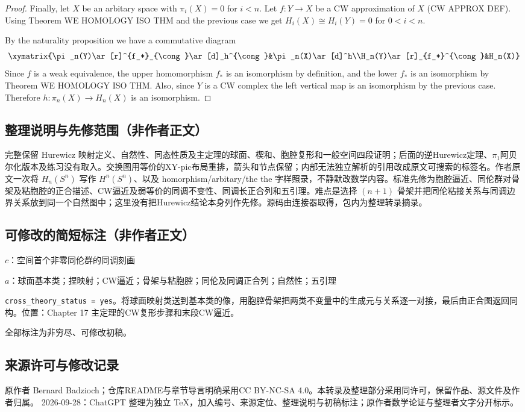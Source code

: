 \documentclass[UTF8,11pt]{ctexart}
\theoremstyle{definition}
\begin{document}
\begin{proof}
Finally, let $X$ be an arbitary space with $\pi_i(X)=0$ for $i<n$. Let $f:Y\to X$ be a CW approximation of $X$ (\textsf{CW APPROX DEF}). Using Theorem \textsf{WE HOMOLOGY ISO THM} and the previous case we get $H_i(X)\cong H_i(Y)=0$ for $0<i<n$.

By the naturality proposition we have a commutative diagram
\[
\xymatrix{\pi_n(Y)\ar[r]^{f_*}_{\cong}\ar[d]_h^{\cong}&\pi_n(X)\ar[d]^h\\H_n(Y)\ar[r]_{f_*}^{\cong}&H_n(X)}
\]
Since $f$ is a weak equivalence, the upper homomorphism $f_*$ is an isomorphism by definition, and the lower $f_*$ is an isomorphism by Theorem \textsf{WE HOMOLOGY ISO THM}. Also, since $Y$ is a CW complex the left vertical map is an isomorphism by the previous case. Therefore $h:\pi_n(X)\to H_n(X)$ is an isomorphism.
\end{proof}

\subsection*{整理说明与先修范围（非作者正文）}
完整保留 Hurewicz 映射定义、自然性、同态性质及主定理的球面、楔和、胞腔复形和一般空间四段证明；后面的逆Hurewicz定理、$\pi_1$阿贝尔化版本及练习没有取入。交换图用等价的XY-pic布局重排，箭头和节点保留；内部无法独立解析的引用改成原文可搜索的标签名。作者原文一次将 $H_n(S^n)$ 写作 $H^n(S^n)$、以及 homorphism/arbitary/the the 字样照录，不静默改数学内容。标准先修为胞腔逼近、同伦群对骨架及粘胞腔的正合描述、CW逼近及弱等价的同调不变性、同调长正合列和五引理。难点是选择 $(n+1)$ 骨架并把同伦粘接关系与同调边界关系放到同一个自然图中；这里没有把Hurewicz结论本身列作先修。源码由连接器取得，包内为整理转录摘录。
\subsection*{可修改的简短标注（非作者正文）}
$c$：空间首个非零同伦群的同调刻画

$a$：球面基本类；捏映射；CW逼近；骨架与粘胞腔；同伦及同调正合列；自然性；五引理

\texttt{cross\_theory\_status = yes}。将球面映射类送到基本类的像，用胞腔骨架把两类不变量中的生成元与关系逐一对接，最后由正合图返回同构。位置：Chapter 17 主定理的CW复形步骤和末段CW逼近。

全部标注为非穷尽、可修改初稿。
\subsection*{来源许可与修改记录}
原作者 Bernard Badzioch；仓库README与章节导言明确采用CC BY-NC-SA 4.0。本转录及整理部分采用同许可，保留作品、源文件及作者归属。
2026-09-28：ChatGPT 整理为独立 TeX，加入编号、来源定位、整理说明与初稿标注；原作者数学论证与整理者文字分开标示。
\end{document}
